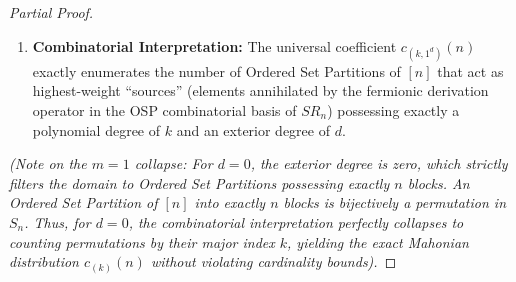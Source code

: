 \documentclass[12pt]{article}
\begin{document}
\begin{proof}[Partial Proof]
\begin{enumerate}
    \item \textbf{Combinatorial Interpretation:} The universal coefficient $c_{(k, 1^d)}(n)$ exactly enumerates the number of Ordered Set Partitions of $[n]$ that act as highest-weight ``sources'' (elements annihilated by the fermionic derivation operator in the OSP combinatorial basis of $SR_n$) possessing exactly a polynomial degree of $k$ and an exterior degree of $d$. 
\end{enumerate}

\emph{(Note on the $m=1$ collapse: For $d=0$, the exterior degree is zero, which strictly filters the domain to Ordered Set Partitions possessing exactly $n$ blocks. An Ordered Set Partition of $[n]$ into exactly $n$ blocks is bijectively a permutation in $S_n$. Thus, for $d=0$, the combinatorial interpretation perfectly collapses to counting permutations by their major index $k$, yielding the exact Mahonian distribution $c_{(k)}(n)$ without violating cardinality bounds).}
\end{proof}
\end{document}
